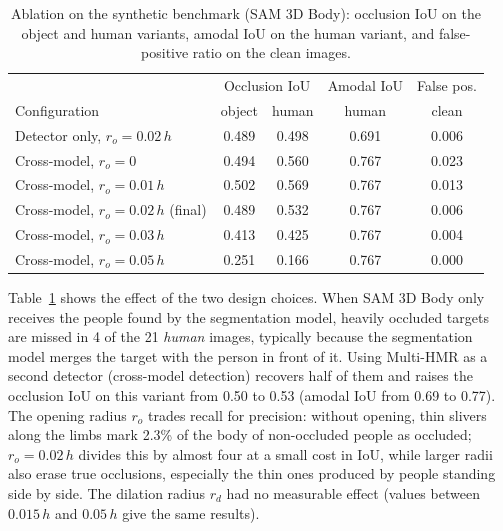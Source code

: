 \documentclass[pdflatex,sn-mathphys-num]{sn-jnl}%
\begin{document}
\begin{table}[!h]
  \centering
  \caption{Ablation on the synthetic benchmark (SAM 3D Body): occlusion IoU on the object and human variants, amodal IoU on the human variant, and false-positive ratio on the clean images.}
  \label{tab:ablation}
  \begin{tabular}{lcccc}
    \toprule
    & \multicolumn{2}{c}{Occlusion IoU} & Amodal IoU & False pos. \\
    Configuration & object & human & human & clean \\
    \midrule
    Detector only, $r_o=0.02\,h$      & 0.489 & 0.498 & 0.691 & 0.006 \\
    Cross-model, $r_o=0$              & 0.494 & 0.560 & 0.767 & 0.023 \\
    Cross-model, $r_o=0.01\,h$        & 0.502 & 0.569 & 0.767 & 0.013 \\
    Cross-model, $r_o=0.02\,h$ (final) & 0.489 & 0.532 & 0.767 & 0.006 \\
    Cross-model, $r_o=0.03\,h$        & 0.413 & 0.425 & 0.767 & 0.004 \\
    Cross-model, $r_o=0.05\,h$        & 0.251 & 0.166 & 0.767 & 0.000 \\
    \bottomrule
  \end{tabular}
\end{table}


Table~\ref{tab:ablation} shows the effect of the two design choices. When SAM 3D Body only receives the people found by the segmentation model, heavily occluded targets are missed in 4 of the 21 \emph{human} images, typically because the segmentation model merges the target with the person in front of it. Using Multi-HMR as a second detector (cross-model detection) recovers half of them and raises the occlusion IoU on this variant from 0.50 to 0.53 (amodal IoU from 0.69 to 0.77). The opening radius $r_o$ trades recall for precision: without opening, thin slivers along the limbs mark 2.3\% of the body of non-occluded people as occluded; $r_o = 0.02\,h$ divides this by almost four at a small cost in IoU, while larger radii also erase true occlusions, especially the thin ones produced by people standing side by side. The dilation radius $r_d$ had no measurable effect (values between $0.015\,h$ and $0.05\,h$ give the same results).
\end{document}
